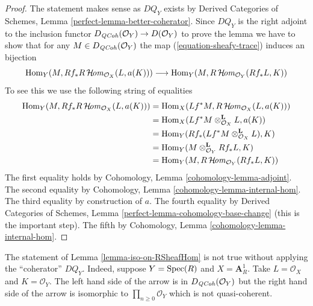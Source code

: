 \begin{proof}
The statement makes sense as $DQ_Y$ exists by
Derived Categories of Schemes, Lemma \ref{perfect-lemma-better-coherator}.
Since $DQ_Y$ is the right adjoint to the inclusion
functor $D_{\mathit{QCoh}}(\mathcal{O}_Y) \to D(\mathcal{O}_Y)$
to prove the lemma we have to show that for any $M \in D_{\mathit{QCoh}}(\mathcal{O}_Y)$
the map (\ref{equation-sheafy-trace}) induces an bijection
$$
\mathop{\mathrm{Hom}}\nolimits_Y(M, Rf_*R\mathop{\mathcal{H}\!\mathit{om}}\nolimits_{\mathcal{O}_X}(L, a(K)))
\longrightarrow
\mathop{\mathrm{Hom}}\nolimits_Y(M, R\mathop{\mathcal{H}\!\mathit{om}}\nolimits_{\mathcal{O}_Y}(Rf_*L, K))
$$
To see this we use the following string of equalities
\begin{align*}
\mathop{\mathrm{Hom}}\nolimits_Y(M, Rf_*R\mathop{\mathcal{H}\!\mathit{om}}\nolimits_{\mathcal{O}_X}(L, a(K)))
& =
\mathop{\mathrm{Hom}}\nolimits_X(Lf^*M, R\mathop{\mathcal{H}\!\mathit{om}}\nolimits_{\mathcal{O}_X}(L, a(K))) \\
& =
\mathop{\mathrm{Hom}}\nolimits_X(Lf^*M \otimes_{\mathcal{O}_X}^\mathbf{L} L, a(K)) \\
& =
\mathop{\mathrm{Hom}}\nolimits_Y(Rf_*(Lf^*M \otimes_{\mathcal{O}_X}^\mathbf{L} L), K) \\
& =
\mathop{\mathrm{Hom}}\nolimits_Y(M \otimes_{\mathcal{O}_Y}^\mathbf{L} Rf_*L, K) \\
& =
\mathop{\mathrm{Hom}}\nolimits_Y(M, R\mathop{\mathcal{H}\!\mathit{om}}\nolimits_{\mathcal{O}_Y}(Rf_*L, K))
\end{align*}
The first equality holds by Cohomology, Lemma \ref{cohomology-lemma-adjoint}.
The second equality by Cohomology, Lemma \ref{cohomology-lemma-internal-hom}.
The third equality by construction of $a$.
The fourth equality by Derived Categories of Schemes, Lemma
\ref{perfect-lemma-cohomology-base-change} (this is the important step).
The fifth by Cohomology, Lemma \ref{cohomology-lemma-internal-hom}.
\end{proof}

\begin{example}
\label{example-iso-on-RSheafHom}
The statement of Lemma \ref{lemma-iso-on-RSheafHom} is not true without
applying the ``coherator'' $DQ_Y$. Indeed, suppose $Y = \mathop{\mathrm{Spec}}(R)$ and
$X = \mathbf{A}^1_R$. Take $L = \mathcal{O}_X$ and $K = \mathcal{O}_Y$.
The left hand side of the arrow is in $D_{\mathit{QCoh}}(\mathcal{O}_Y)$ but
the right hand side of the arrow is isomorphic to
$\prod_{n \geq 0} \mathcal{O}_Y$ which is not quasi-coherent.
\end{example}

